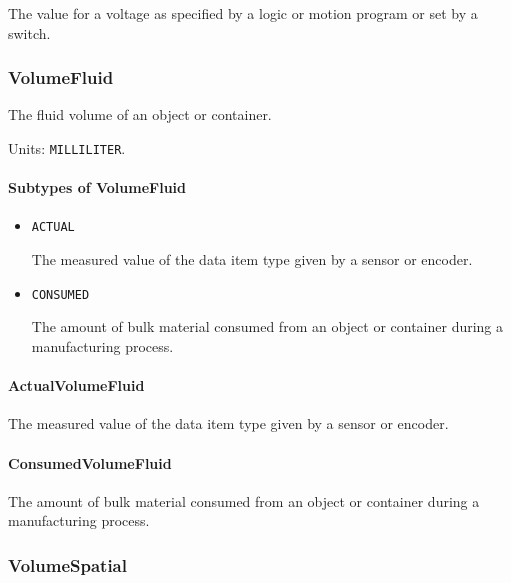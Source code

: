 The value for a voltage as specified by a logic or motion program or set by a switch.


\subsubsection{VolumeFluid}
\label{sec:VolumeFluid}



The fluid volume of an object or container.


Units: \texttt{MILLILITER}.

\paragraph{Subtypes of VolumeFluid}\mbox{}
\label{sec:Subtypes of VolumeFluid}

\begin{itemize}

\item \texttt{ACTUAL}


The measured value of the data item type given by a sensor or encoder.

\item \texttt{CONSUMED}


The amount of bulk material consumed from an object or container during a manufacturing process.


\end{itemize}

\paragraph{ActualVolumeFluid}\mbox{}
\label{sec:ActualVolumeFluid}


The measured value of the data item type given by a sensor or encoder.


\paragraph{ConsumedVolumeFluid}\mbox{}
\label{sec:ConsumedVolumeFluid}


The amount of bulk material consumed from an object or container during a manufacturing process.


\subsubsection{VolumeSpatial}
\label{sec:VolumeSpatial}



